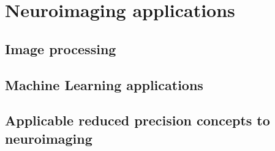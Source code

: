 \chapter{Neuroimaging applications}
\label{ch:neuroimaging}
\begin{comment}
This section will discuss:
1. Image processing in neuroimaging
2. ML applications
3. Applicable RP concepts to neuroimaging

In the first 2 bullet point, talk in about the general field, then focus on the
main topic of interest.
Setup the context of the topic to justify the methods used.
\end{comment}

\section{Image processing}

\section{Machine Learning applications}

\section{Applicable reduced precision concepts to neuroimaging}
